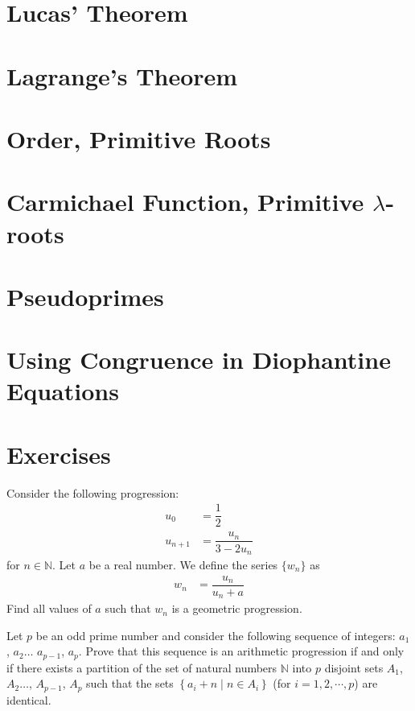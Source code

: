 \section{Lucas' Theorem}
	
\section{Lagrange's Theorem}
	
\section{Order, Primitive Roots} \label{sec:order}
	
\section{Carmichael Function, Primitive \texorpdfstring{$\lambda$}{L}-roots}
	
\section{Pseudoprimes} \label{sec:pseudoprimes}
	
\section{Using Congruence in Diophantine Equations}
	

	\newpage
	\section{Exercises}

\begin{problem} %
	Consider the following progression:
		\begin{align*}
			u_0 &= \dfrac{1}{2}\\
			u_{n+1} &= \dfrac{u_n}{3-2u_n}
		\end{align*}
	for $n\in\mathbb{N}$. Let $a$ be a real number. We define the series $\{w_n\}$ as
		\begin{align*}
			w_n &= \dfrac{u_n}{u_n + a}
		\end{align*}
	Find all values of $a$ such that $w_n$ is a geometric progression.
\end{problem}

\begin{problem} %
	Let $p$ be an odd prime number and consider the following sequence of integers: $a_1$, $a_2\ldots$ $a_{p-1}$, $a_p$. Prove that this sequence is an arithmetic progression if and only if there exists a partition of the set of natural numbers $\mathbb{N}$ into $p$ disjoint sets $A_1$, $A_2\ldots$, $A_{p-1}$, $A_p$ such that the sets $\left\{ a_i+n\mid n\in A_i\right\}$ (for $i=1, 2,\cdots, p$) are identical.
\end{problem}

